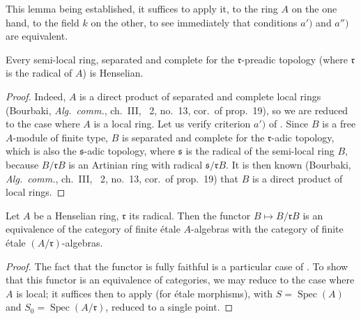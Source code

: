 This lemma being established, it suffices to apply it, to the ring $A$ on the one hand, to the field $k$ on the other, to see immediately that conditions $a')$ and $a'')$ are equivalent.

\begin{proposition}[18.5.14]
\label{IV.18.5.14}
Every semi-local ring, separated and complete for the $\mathfrak{r}$-preadic topology (where $\mathfrak{r}$ is the radical of $A$) is Henselian.
\end{proposition}

\begin{proof}
Indeed, $A$ is a direct product of separated and complete local rings (Bourbaki, \emph{Alg.\ comm.}, ch.~III, \textsection~2, no.~13, cor.\ of prop.~19), so we are reduced to the case where $A$ is a local ring.
Let us verify criterion $a')$ of .
Since $B$ is a free $A$-module of finite type, $B$ is separated and complete for the $\mathfrak{r}$-adic topology, which is also the $\mathfrak{s}$-adic topology, where $\mathfrak{s}$ is the radical of the semi-local ring $B$, because $B/\mathfrak{r}B$ is an Artinian ring with radical $\mathfrak{s}/\mathfrak{r}B$.
It is then known (Bourbaki, \emph{Alg.\ comm.}, ch.~III, \textsection~2, no.~13, cor.\ of prop.~19) that $B$ is a direct product of local rings.
\end{proof}

\begin{proposition}[18.5.15]
\label{IV.18.5.15}
Let $A$ be a Henselian ring, $\mathfrak{r}$ its radical.
Then the functor $B\mapsto B/\mathfrak{r}B$ is an equivalence of the category of finite \'etale $A$-algebras with the category of finite \'etale $(A/\mathfrak{r})$-algebras.
\end{proposition}

\begin{proof}
The fact that the functor is fully faithful is a particular case of .
To show that this functor is an equivalence of categories, we may reduce to the case where $A$ is local;
it suffices then to apply  (for \'etale morphisms), with $S=\operatorname{Spec}(A)$ and $S_0=\operatorname{Spec}(A/\mathfrak{r})$, reduced to a single point.
\end{proof}

